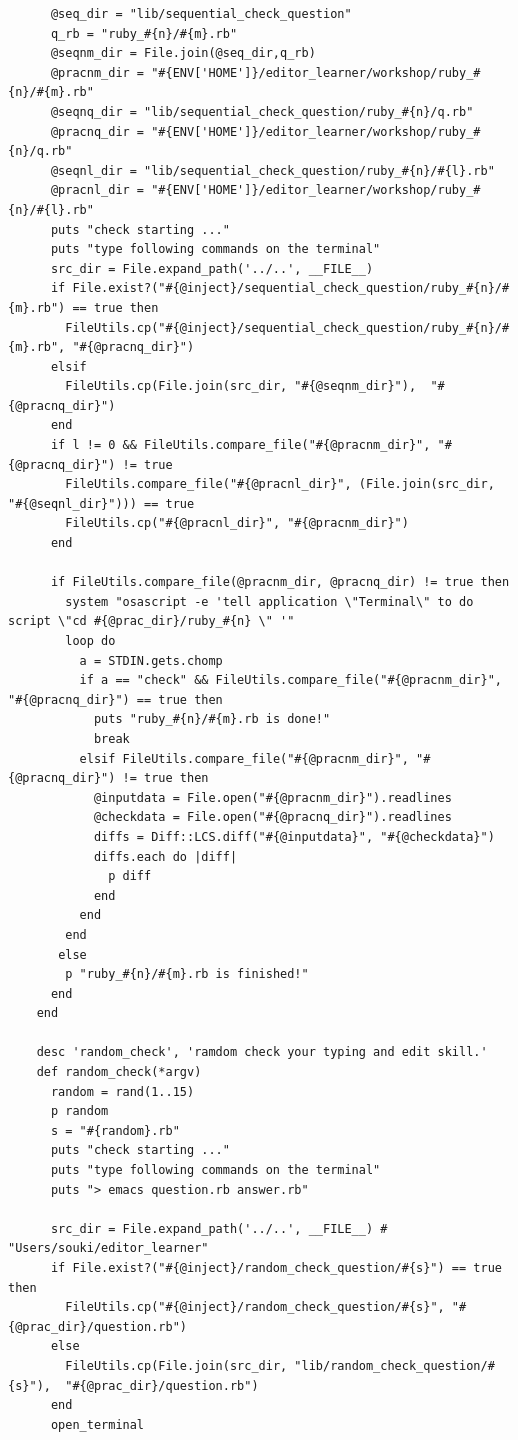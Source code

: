 \documentclass[11pt,dvipdfmx]{jsarticle}
\begin{document}
\begin{verbatim}
      @seq_dir = "lib/sequential_check_question"
      q_rb = "ruby_#{n}/#{m}.rb"
      @seqnm_dir = File.join(@seq_dir,q_rb)
      @pracnm_dir = "#{ENV['HOME']}/editor_learner/workshop/ruby_#{n}/#{m}.rb"
      @seqnq_dir = "lib/sequential_check_question/ruby_#{n}/q.rb"
      @pracnq_dir = "#{ENV['HOME']}/editor_learner/workshop/ruby_#{n}/q.rb"      
      @seqnl_dir = "lib/sequential_check_question/ruby_#{n}/#{l}.rb"
      @pracnl_dir = "#{ENV['HOME']}/editor_learner/workshop/ruby_#{n}/#{l}.rb"      
      puts "check starting ..."
      puts "type following commands on the terminal"
      src_dir = File.expand_path('../..', __FILE__)
      if File.exist?("#{@inject}/sequential_check_question/ruby_#{n}/#{m}.rb") == true then
        FileUtils.cp("#{@inject}/sequential_check_question/ruby_#{n}/#{m}.rb", "#{@pracnq_dir}")
      elsif
        FileUtils.cp(File.join(src_dir, "#{@seqnm_dir}"),  "#{@pracnq_dir}")
      end
      if l != 0 && FileUtils.compare_file("#{@pracnm_dir}", "#{@pracnq_dir}") != true
        FileUtils.compare_file("#{@pracnl_dir}", (File.join(src_dir, "#{@seqnl_dir}"))) == true
        FileUtils.cp("#{@pracnl_dir}", "#{@pracnm_dir}")
      end
      
      if FileUtils.compare_file(@pracnm_dir, @pracnq_dir) != true then
        system "osascript -e 'tell application \"Terminal\" to do script \"cd #{@prac_dir}/ruby_#{n} \" '"
        loop do
          a = STDIN.gets.chomp
          if a == "check" && FileUtils.compare_file("#{@pracnm_dir}", "#{@pracnq_dir}") == true then
            puts "ruby_#{n}/#{m}.rb is done!"
            break
          elsif FileUtils.compare_file("#{@pracnm_dir}", "#{@pracnq_dir}") != true then
            @inputdata = File.open("#{@pracnm_dir}").readlines
            @checkdata = File.open("#{@pracnq_dir}").readlines
            diffs = Diff::LCS.diff("#{@inputdata}", "#{@checkdata}")
            diffs.each do |diff|
              p diff
            end
          end
        end
       else
        p "ruby_#{n}/#{m}.rb is finished!"
      end
    end

    desc 'random_check', 'ramdom check your typing and edit skill.'
    def random_check(*argv)
      random = rand(1..15)
      p random
      s = "#{random}.rb"
      puts "check starting ..."
      puts "type following commands on the terminal"
      puts "> emacs question.rb answer.rb"

      src_dir = File.expand_path('../..', __FILE__) # "Users/souki/editor_learner"
      if File.exist?("#{@inject}/random_check_question/#{s}") == true then
        FileUtils.cp("#{@inject}/random_check_question/#{s}", "#{@prac_dir}/question.rb")
      else
        FileUtils.cp(File.join(src_dir, "lib/random_check_question/#{s}"),  "#{@prac_dir}/question.rb")
      end
      open_terminal
      

\end{verbatim}
\end{document}
